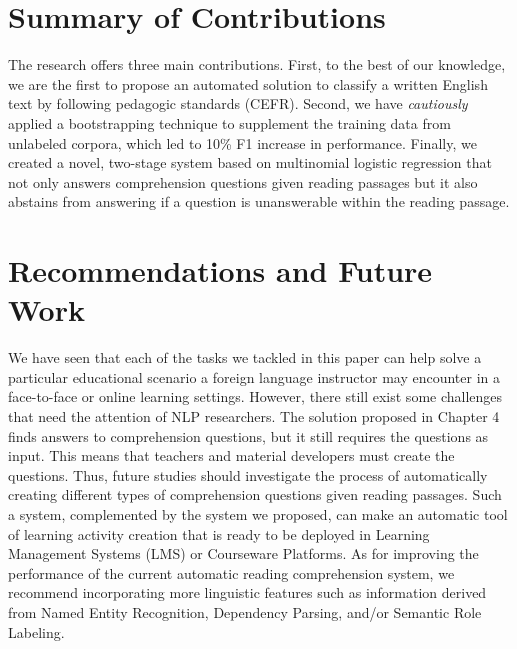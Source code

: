 \section{Summary of Contributions}

The research offers three main contributions. First, to the best of our knowledge, we are the first to propose an automated solution to classify a written English text by following pedagogic standards (CEFR). Second, we have \emph{cautiously} applied a bootstrapping technique to supplement the training data from unlabeled corpora, which led to 10\% F1 increase in performance. Finally, we created a novel, two-stage system based on multinomial logistic regression that not only answers comprehension questions given reading passages but it also abstains from answering if a question is unanswerable within the reading passage. 

\section{Recommendations and Future Work}

We have seen that each of the tasks we tackled in this paper can help solve a particular educational scenario a foreign language instructor may encounter in a face-to-face or online learning settings. However, there still exist some challenges that need the attention of NLP researchers. The solution proposed in Chapter 4 finds answers to comprehension questions, but it still requires the questions as input. This means that teachers and material developers must create the questions. Thus, future studies should investigate the process of automatically creating different types of comprehension questions given reading passages. Such a system, complemented by the system we proposed, can make an automatic tool of learning activity creation that is ready to be deployed in Learning Management Systems (LMS) or Courseware Platforms. As for improving the performance of the current automatic reading comprehension system, we recommend incorporating more linguistic features such as information derived from Named Entity Recognition, Dependency Parsing, and/or Semantic Role Labeling. 

